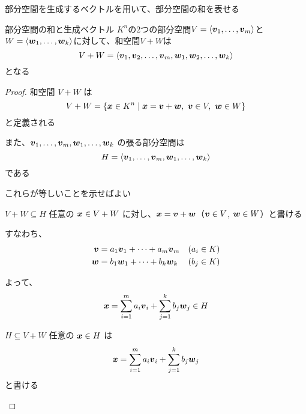 \documentclass[../../../topic_linear-algebra]{subfiles}
\begin{document}
\sectionline

部分空間を生成するベクトルを用いて、部分空間の和を表せる

\begin{theorem}{部分空間の和と生成ベクトル}\label{thm:sum-of-subspaces-span}
  $K^n$の2つの部分空間$V = \langle \vb*{v}_1, \dots, \vb*{v}_m \rangle$と
  $W = \langle \vb*{w}_1, \dots, \vb*{w}_k \rangle$に対して、和空間$V + W$は
  \begin{equation*}
    V + W = \langle \vb*{v}_1, \vb*{v}_2, \dots, \vb*{v}_m, \vb*{w}_1, \vb*{w}_2, \dots, \vb*{w}_k \rangle
  \end{equation*}
  となる
\end{theorem}

\begin{proof}
  和空間 $V + W$ は
  \begin{equation*}
    V + W = \{ \vb*{x} \in K^n \mid \vb*{x} = \vb*{v} + \vb*{w},\ \vb*{v} \in V,\ \vb*{w} \in W \}
  \end{equation*}
  と定義される

  また、$\vb*{v}_1, \dots, \vb*{v}_m, \vb*{w}_1, \dots, \vb*{w}_k$ の張る部分空間は
  \begin{equation*}
    H = \langle \vb*{v}_1, \dots, \vb*{v}_m, \vb*{w}_1, \dots, \vb*{w}_k \rangle
  \end{equation*}
  である

  これらが等しいことを示せばよい

  \begin{subpattern}{$V+W \subseteq H$}
    任意の $\vb*{x} \in V + W$ に対し、$\vb*{x} = \vb*{v} + \vb*{w}$（$\vb*{v} \in V$, $\vb*{w} \in W$）と書ける

    すなわち、
    \begin{align*}
      \vb*{v} & = a_1 \vb*{v}_1 + \dots + a_m \vb*{v}_m & (a_i \in K) \\
      \vb*{w} & = b_1 \vb*{w}_1 + \dots + b_k \vb*{w}_k & (b_j \in K)
    \end{align*}

    よって、
    \begin{equation*}
      \vb*{x} = \sum_{i=1}^m a_i \vb*{v}_i + \sum_{j=1}^k b_j \vb*{w}_j \in H
    \end{equation*}
  \end{subpattern}

  \begin{subpattern}{$H \subseteq V + W$}
    任意の $\vb*{x} \in H$ は
    \begin{equation*}
      \vb*{x} = \sum_{i=1}^m a_i \vb*{v}_i + \sum_{j=1}^k b_j \vb*{w}_j
    \end{equation*}
    と書ける


\end{subpattern}
\end{proof}
\end{document}
